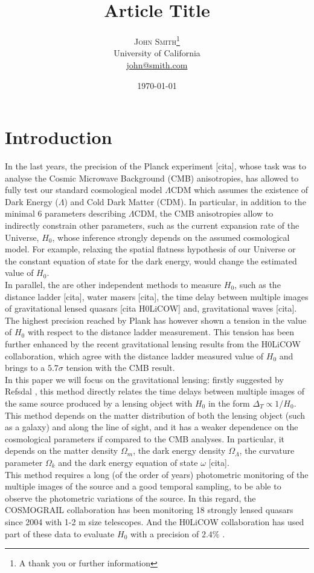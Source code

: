 \documentclass[twoside,twocolumn]{article}
\title{Article Title} %
\author{%
\textsc{John Smith}\thanks{A thank you or further information} \\[1ex] %
\normalsize University of California \\ %
\normalsize \href{mailto:john@smith.com}{john@smith.com} %
}
\date{\today} %
\begin{document}
\maketitle


\section{Introduction}
In the last years, the precision of the Planck experiment [cita], whose task was to analyse the Cosmic Microwave Background (CMB) anisotropies, has allowed to fully test our standard cosmological model $\Lambda$CDM which assumes the existence of Dark Energy ($\Lambda$) and Cold Dark Matter (CDM). In particular, in addition to the minimal 6 parameters describing $\Lambda$CDM, the CMB anisotropies allow to indirectly constrain other parameters, such as the current expansion rate of the Universe, $H_0$, whose inference strongly depends on the assumed cosmological model. For example, relaxing the spatial flatness hypothesis of our Universe or the constant equation of state for the dark energy, would change the estimated value of $H_0$.
\\
In parallel, the are other independent methods to measure $H_0$, such as the distance ladder [cita], water masers [cita], the time delay between multiple images of gravitational lensed quasars [cita H0LiCOW] and, gravitational waves [cita]. The highest precision reached by Plank has however shown a tension in the value of $H_0$ with respect to the distance ladder measurement. This tension has been further enhanced by the recent gravitational lensing results from the H0LiCOW collaboration, which agree with the distance ladder measured value of  $H_0$ and brings to a $5.7 \sigma$ tension with the CMB result.
\\
In this paper we will focus on the gravitational lensing: firstly suggested by Refsdal \cite{refsdal}, this method directly relates the time delays between multiple images of the same source produced by a lensing object with $H_0$ in the form $\Delta_T \propto 1/H_0$. This method depends on the matter distribution of both the lensing object (such as a galaxy) and along the line of sight, and it has a weaker dependence on the cosmological parameters if compared to the CMB analyses. In particular, it depends on the matter density $\Omega_m$, the dark energy density $\Omega_\Lambda$, the curvature parameter $\Omega_k$ and the dark energy equation of state $\omega$ [cita].
\\
This method requires a long (of the order of years) photometric monitoring of the multiple images of the source and a good temporal sampling, to be able to observe the photometric variations of the source. In this regard, the COSMOGRAIL collaboration has been monitoring 18 strongly lensed quasars since 2004 \cite{cosmograil} with 1-2 m size telescopes. And the H0LiCOW collaboration has used part of these data to evaluate $H_0$ with a precision of $2.4\%$ \cite{h0licow_XIII}. 
\\
\end{document}

